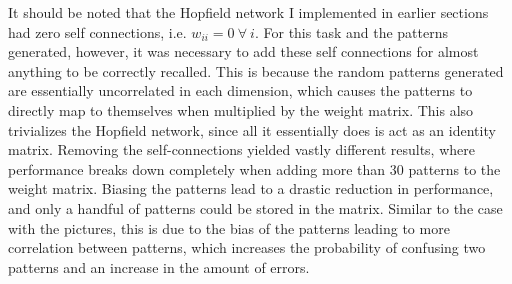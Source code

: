 \documentclass[a4paper]{article}
\begin{document}
It should be noted that the Hopfield network I implemented in earlier sections had zero self connections, i.e. $w_{ii} = 0 \ \forall \ i$. For this task and the patterns generated, however, it was necessary to add these self connections for almost anything to be correctly recalled. This is because the random patterns generated are essentially uncorrelated in each dimension, which causes the patterns to directly map to themselves when multiplied by the weight matrix. This also trivializes the Hopfield network, since all it essentially does is act as an identity matrix.
Removing the self-connections yielded vastly different results, where performance breaks down completely when adding more than 30 patterns to the weight matrix. Biasing the patterns lead to a drastic reduction in performance, and only a handful of patterns could be stored in the matrix. Similar to the case with the pictures, this is due to the bias of the patterns leading to more correlation between patterns, which increases the probability of confusing two patterns and an increase in the amount of errors.
\end{document}

